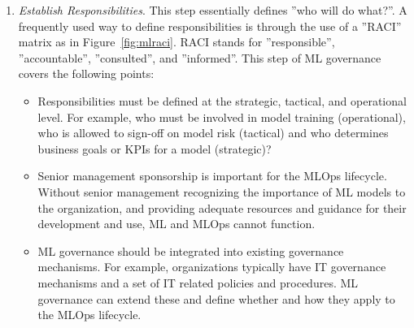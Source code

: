 \begin{enumerate}
\item \emph{Establish Responsibilities}. This step essentially defines ''who will do what?''. A frequently used way to define responsibilities is through the use of a ''RACI'' matrix as in Figure~\ref{fig:mlraci}. RACI stands for ''responsible'', ''accountable'', ''consulted'', and ''informed''. This step of ML governance covers the following points:
\begin{itemize}
  \item Responsibilities must be defined at the strategic, tactical, and operational level. For example, who must be involved in model training (operational), who is allowed to sign-off on model risk (tactical) and who determines business goals or KPIs for a model (strategic)?
  \item Senior management sponsorship is important for the MLOps lifecycle. Without senior management recognizing the importance of ML models to the organization, and providing adequate resources and guidance for their development and use, ML and MLOps cannot function. 
  \item ML governance should be integrated into existing governance mechanisms. For example, organizations typically have IT governance mechanisms and a set of IT related policies and procedures. ML governance can extend these and define whether and how they apply to the MLOps lifecycle.
\end{itemize}


\end{enumerate}
